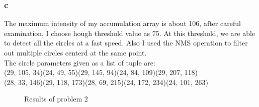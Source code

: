 \documentclass[12pt,letterpaper]{article}
\begin{document}
\subsubsection*{c}
The maximum intensity of my accumulation array is about 106,
after careful examination, I choose hough threshold value as 75.
At this threshold, we are able to detect all the circles at a fast speed.
Also I used the NMS operation to filter out multiple circles centerd at the same point.\\
The circle parameters given as a list of tuple are:\\
(29, 105, 34)(24, 49, 55)(29, 145, 94)(24, 84, 109)(29, 207, 118)\\
(28, 33, 146)(29, 118, 173)(28, 69, 215)(24, 172, 234)(24, 101, 263)
\begin{figure}[htbp]
  \centering
  \caption{Results of problem 2}
  \label{labeled_img}
\end{figure}
\end{document}
